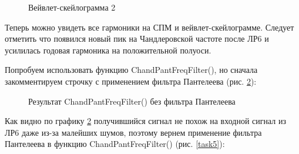 \documentclass[a4paper,oneside,14pt]{extreport}
\begin{document}
\begin{figure}[!h]
	\caption{Вейвлет-скейлограмма 2}
	\label{task1_cwt2}
\end{figure}

Теперь можно увидеть все гармоники на СПМ и вейвлет-скейлограмме. Следует отметить что появился новый пик на Чандлеровской частоте после ЛР6 и усилилась годовая гармоника на положительной полуоси.

\newpage
Попробуем использовать функцию ChandPantFreqFilter(), но сначала закомментируем строчку с применением фильтра Пантелеева (рис. \ref{task4}):

\begin{figure}[!h]
	\caption{Результат ChandPantFreqFilter() без фильтра Пантелеева}
	\label{task4}
\end{figure}

Как видно по графику \ref{task4} получившийся сигнал не похож на входной сигнал из ЛР6 даже из-за малейших шумов, поэтому вернем применение фильтра Пантелеева в функцию ChandPantFreqFilter() (рис. \ref{task5}):
\end{document}
